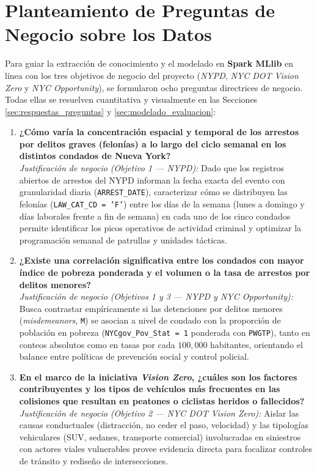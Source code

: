 \section{Planteamiento de Preguntas de Negocio sobre los Datos}
\label{sec:preguntas_negocio}

Para guiar la extracción de conocimiento y el modelado en \textbf{Spark MLlib} en línea con los tres objetivos de negocio del proyecto (\textit{NYPD}, \textit{NYC DOT Vision Zero} y \textit{NYC Opportunity}), se formularon ocho preguntas directrices de negocio. Todas ellas se resuelven cuantitativa y visualmente en las Secciones \ref{sec:respuestas_preguntas} y \ref{sec:modelado_evaluacion}:

\begin{enumerate}

    \item \textbf{¿Cómo varía la concentración espacial y temporal de los arrestos por delitos graves (felonías) a lo largo del ciclo semanal en los distintos condados de Nueva York?}\\
    \textit{Justificación de negocio (Objetivo 1 --- NYPD):} Dado que los registros abiertos de arrestos del NYPD informan la fecha exacta del evento con granularidad diaria (\texttt{ARREST\_DATE}), caracterizar cómo se distribuyen las felonías (\texttt{LAW\_CAT\_CD = 'F'}) entre los días de la semana (lunes a domingo y días laborales frente a fin de semana) en cada uno de los cinco condados permite identificar los picos operativos de actividad criminal y optimizar la programación semanal de patrullas y unidades tácticas.

    \item \textbf{¿Existe una correlación significativa entre los condados con mayor índice de pobreza ponderada y el volumen o la tasa de arrestos por delitos menores?}\\
    \textit{Justificación de negocio (Objetivos 1 y 3 --- NYPD y NYC Opportunity):} Busca contrastar empíricamente si las detenciones por delitos menores (\textit{misdemeanors}, \texttt{M}) se asocian a nivel de condado con la proporción de población en pobreza (\texttt{NYCgov\_Pov\_Stat = 1} ponderada con \texttt{PWGTP}), tanto en conteos absolutos como en tasas por cada $100,000$ habitantes, orientando el balance entre políticas de prevención social y control policial.

    \item \textbf{En el marco de la iniciativa \textit{Vision Zero}, ¿cuáles son los factores contribuyentes y los tipos de vehículos más frecuentes en las colisiones que resultan en peatones o ciclistas heridos o fallecidos?}\\
    \textit{Justificación de negocio (Objetivo 2 --- NYC DOT Vision Zero):} Aislar las causas conductuales (distracción, no ceder el paso, velocidad) y las tipologías vehiculares (SUV, sedanes, transporte comercial) involucradas en siniestros con actores viales vulnerables provee evidencia directa para focalizar controles de tránsito y rediseño de intersecciones.


\end{enumerate}
